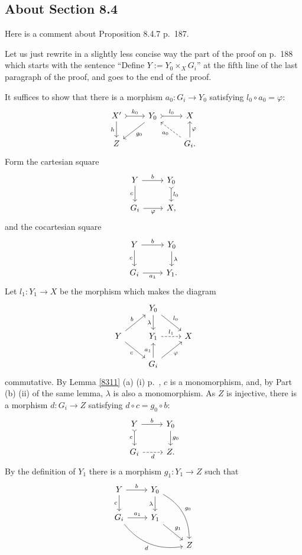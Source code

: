\documentclass[12pt]{article}
\theoremstyle{remark}
\theoremstyle{definition}
\newcommand{\pp}{\varphi}
\begin{document}

\subsection{About Section 8.4} 

Here is a comment about Proposition 8.4.7 p.~187. 

Let us just rewrite in a slightly less concise way the part of the proof on p.~188 which starts with the sentence ``Define $Y:=Y_0\times_XG_i$'' at the fifth line of the last paragraph of the proof, and goes to the end of the proof. 

It suffices to show that there is a morphism $a_0:G_i\to Y_0$ satisfying $l_0\circ a_0=\pp$:
$$
\begin{tikzcd}
X'\ar{d}[swap]{h}\ar[tail]{r}{k_0}&Y_0\ar{dl}{g_0}\ar[tail]{r}{l_0}&X\\ 
Z&&G_i.\ar[dashed]{ul}{a_0}\ar{u}[swap]{\pp}
\end{tikzcd}
$$ 
Form the cartesian square 
$$
\begin{tikzcd}
Y\ar{r}{b}\ar[swap]{d}{c}&Y_0\ar[tail]{d}{l_0}\\
G_i\ar[swap]{r}{\pp}&X,
\end{tikzcd}
$$
and the cocartesian square 
$$
\begin{tikzcd}
Y\ar{r}{b}\ar[swap]{d}{c}&Y_0\ar{d}{\lambda}\\
G_i\ar[swap]{r}{a_1}&Y_1.
\end{tikzcd}
$$ 
Let $l_1:Y_1\to X$ be the morphism which makes the diagram 
$$
\begin{tikzcd}
{}&Y_0\ar{d}[swap]{\lambda}\ar{dr}{l_0}\\ 
Y\ar{ur}{b}\ar{dr}[swap]{c}&Y_1\ar[dashed]{r}{l_1}&X\\ 
{}&G_i\ar{u}{a_1}\ar{ru}[swap]{\pp}
\end{tikzcd}
$$ 
commutative. By Lemma \ref{8311} (a) (i) p.~\pageref{8311}, $c$ is a monomorphism, and, by Part (b) (ii) of the same lemma, $\lambda$ is also a monomorphism. As $Z$ is injective, there is a morphism $d:G_i\to Z$ satisfying $d\circ c=g_0\circ b$: 
$$
\begin{tikzcd}
Y\ar{r}{b}\ar[tail]{d}[swap]{c}&Y_0\ar{d}{g_0}\\ 
G_i\ar[dashed]{r}[swap]{d}&Z.
\end{tikzcd}
$$ 
By the definition of $Y_1$ there is a morphism $g_1:Y_1\to Z$ such that 
$$
\begin{tikzcd}
Y\ar{r}{b}\ar[swap]{d}{c}&Y_0\ar{d}[swap]{\lambda}\ar[bend left]{ddr}{g_0}\\
G_i\ar{r}{a_1}\ar[bend right]{rrd}[swap]{d}&Y_1\ar{dr}{g_1}\\ 
{}&{}&Z
\end{tikzcd}
$$ 
\end{document}
